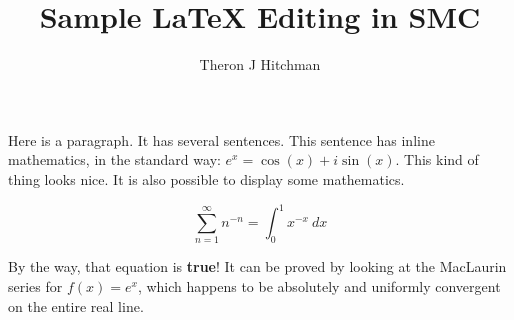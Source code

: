 \documentclass{article}
\title{Sample \LaTeX{} Editing in SMC}
\author{Theron J Hitchman}
\begin{document}
\maketitle

Here is a paragraph. It has several sentences. This sentence has inline mathematics, in the standard way: \( e^x = \cos(x) + i \sin(x) \). This kind of thing looks nice.
It is also possible to display some mathematics.

\[
\sum_{n=1}^{\infty} n^{-n} = \int_0^1 x^{-x}\ dx
\]

By the way, that equation is \textbf{true}! It can be proved by looking at the MacLaurin series for $f(x) = e^x$, which happens to be absolutely and uniformly convergent on the entire real line.
\end{document}
